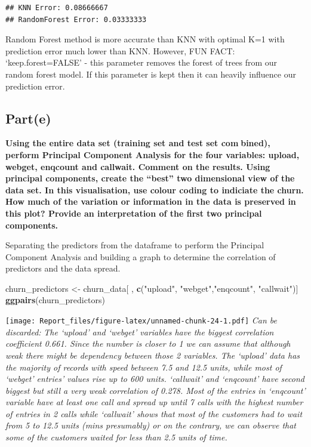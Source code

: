 \documentclass[
]{article}
\newenvironment{Shaded}{\begin{snugshade}}{\end{snugshade}}
\newcommand{\KeywordTok}[1]{\textcolor[rgb]{0.13,0.29,0.53}{\textbf{#1}}}
\newcommand{\NormalTok}[1]{#1}
\newcommand{\StringTok}[1]{\textcolor[rgb]{0.31,0.60,0.02}{#1}}
\begin{document}
\begin{verbatim}
## KNN Error: 0.08666667 
## RandomForest Error: 0.03333333
\end{verbatim}

Random Forest method is more accurate than KNN with optimal K=1 with
prediction error much lower than KNN. However, FUN FACT:
`keep.forest=FALSE' - this parameter removes the forest of trees from
our random forest model. If this parameter is kept then it can heavily
influence our prediction error.

\hypertarget{parte}{%
\subsection{\texorpdfstring{\textbf{Part(e)}}{Part(e)}}\label{parte}}

\textbf{Using the entire data set (training set and test set combined),
perform Principal Component Analysis for the four variables: upload,
webget, enqcount and callwait. Comment on the results. Using principal
components, create the ``best'' two dimensional view of the data set. In
this visualisation, use colour coding to indiciate the churn. How much
of the variation or information in the data is preserved in this plot?
Provide an interpretation of the first two principal components.}

Separating the predictors from the dataframe to perform the Principal
Component Analysis and building a graph to determine the correlation of
predictors and the data spread.

\begin{Shaded}
\begin{Highlighting}[]
\NormalTok{churn_predictors <-}\StringTok{ }\NormalTok{churn_data[ , }\KeywordTok{c}\NormalTok{(}\StringTok{"upload"}\NormalTok{, }\StringTok{"webget"}\NormalTok{,}\StringTok{"enqcount"}\NormalTok{, }\StringTok{"callwait"}\NormalTok{)]}
\KeywordTok{ggpairs}\NormalTok{(churn_predictors)}
\end{Highlighting}
\end{Shaded}

\texttt{[image: Report\_files/figure-latex/unnamed-chunk-24-1.pdf]}
\emph{Can be discarded:} \emph{The `upload' and `webget' variables have
the biggest correlation coefficient 0.661. Since the number is closer to
1 we can assume that although weak there might be dependency between
those 2 variables. The `upload' data has the majority of records with
speed between 7.5 and 12.5 units, while most of `webget' entries' values
rise up to 600 units. `callwait' and `enqcount' have second biggest but
still a very weak correlation of 0.278. Most of the entries in
`enqcount' variable have at least one call and spread up until 7 calls
with the highest number of entries in 2 calls while `callwait' shows
that most of the customers had to wait from 5 to 12.5 units (mins
presumably) or on the contrary, we can observe that some of the
customers waited for less than 2.5 units of time.}
\end{document}
